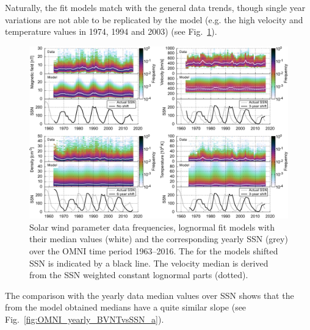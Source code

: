 Naturally, the fit models match with the general data trends, though single year variations are not able to be replicated by the model (e.g. the high velocity and temperature values in 1974, 1994 and 2003) (see Fig.~\ref{fig:OMNI_yearly_BVdblNTSSN_fit_e_plot}).
\begin{figure}
	\includegraphics[width=18cm]{figures/OMNI_yearly_BVdblNTSSN_fit_e_plot.pdf}
	\caption{Solar wind parameter data frequencies, lognormal fit models with their median values (white) and the corresponding yearly SSN (grey) over the OMNI time period 1963--2016. The for the models shifted SSN is indicated by a black line. The velocity median is derived from the SSN weighted constant lognormal parts (dotted).}
	\label{fig:OMNI_yearly_BVdblNTSSN_fit_e_plot}
\end{figure}
The comparison with the yearly data median values over SSN shows that the from the model obtained medians have a quite similar slope (see Fig.~\ref{fig:OMNI_yearly_BVNTvsSSN_a}).
